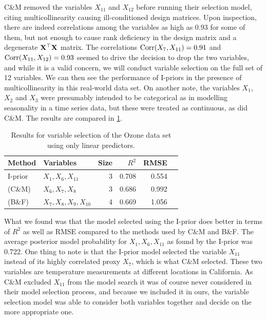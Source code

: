 \documentclass[showframe,11pt,twoside,openright]{report}
\begin{document}
C\&M removed the variables $X_{11}$ and $X_{12}$ before running their selection model, citing multicollinearity causing ill-conditioned design matrices. 
Upon inspection, there are indeed correlations among the variables as high as 0.93 for some of them, but not enough to cause rank deficiency in the design matrix and a degenerate $\mathbf X^\top \mathbf X$ matrix.
The correlations $\operatorname{Corr}(X_7,X_{11}) =0.91$ and $\operatorname{Corr}(X_{11},X_{12}) = 0.93$ seemed to drive the decision to drop the two variables, and while it is a valid concern, we will conduct variable selection on the full set of 12 variables.
We can then see the performance of I-priors in the presence of multicollinearity in this real-world data set. 
On another note, the variables $X_1$, $X_2$ and $X_3$ were presumably intended to be categorical as in modelling seasonality in a time series data, but these were treated as continuous, as did C\&M. 
The results are compared in \cref{tab:ozoneres}.

\begin{table}[htb]
\centering
\caption{Results for variable selection of the Ozone data set using only linear predictors.}
\label{tab:ozoneres}
\begin{tabular}{llrrrr}
\toprule
Method                          &Variables            &Size &$R^2$ &RMSE \\
\midrule
I-prior                         &$X_1,X_6,X_{11}$     &3    &0.708 &0.554 \\
\citeauthor{Casella2006} (C\&M) &$X_6,X_7,X_8$        &3    &0.686 &0.992 \\
\citeauthor{Breiman1985} (B\&F) &$X_7,X_8,X_9,X_{10}$ &4    &0.669 &1.056 \\
\bottomrule
\end{tabular}
\end{table}

What we found was that the model selected using the I-prior does better in terms of $R^2$ as well as RMSE compared to the methods used by C\&M and B\&F. 
The average posterior model probability for $X_1,X_6,X_{11}$ as found by the I-prior was 0.722\footnotemark. 
One thing to note is that the I-prior model selected the variable $X_{11}$ instead of its highly correlated proxy $X_7$, which is what C\&M selected.
These two variables are temperature measurements at different locations in California.
As C\&M excluded $X_{11}$ from the model search it was of course never considered in their model selection process, and because we included it in ours, the variable selection model was able to consider both variables together and decide on the more appropriate one. 
\end{document}
